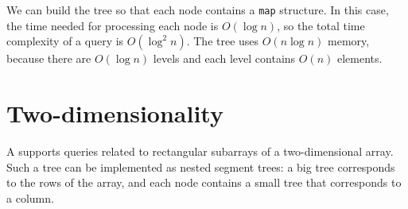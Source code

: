 We can build the tree so
that each node contains a \texttt{map} structure.
In this case, the time needed for processing each
node is $O(\log n)$, so the total time complexity
of a query is $O(\log^2 n)$.
The tree uses $O(n \log n)$ memory,
because there are $O(\log n)$ levels
and each level contains
$O(n)$ elements.

\section{Two-dimensionality}


A  supports
queries related to rectangular subarrays
of a two-dimensional array.
Such a tree can be implemented as
nested segment trees: a big tree corresponds to the
rows of the array, and each node contains a small tree
that corresponds to a column.

